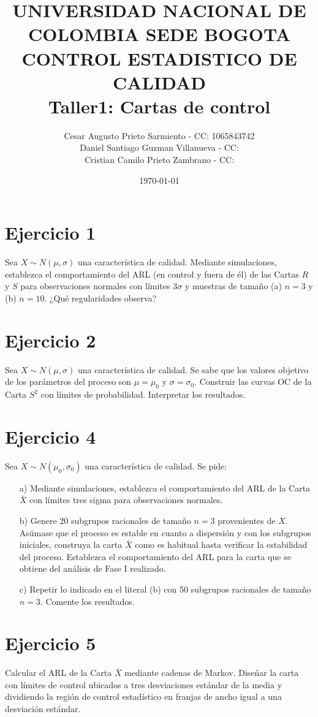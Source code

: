 \documentclass[11pt]{article}\usepackage[]{graphicx}\usepackage[table]{xcolor}
\title{UNIVERSIDAD NACIONAL DE COLOMBIA SEDE BOGOTA\\ CONTROL ESTADISTICO DE CALIDAD\\Taller1: Cartas de control }
\author{Cesar Augusto Prieto Sarmiento - CC: 1065843742\\
        Daniel Santiago Guzman Villanueva - CC: \\
        Cristian Camilo Prieto Zambrano - CC: }
\date{\today}
\begin{document}
\maketitle

\section*{Ejercicio 1}
Sea $X \sim N(\mu, \sigma)$ una característica de calidad. Mediante simulaciones, establezca el comportamiento del ARL (en control y fuera de él) de las Cartas $R$ y $S$ para observaciones normales con límites $3 \sigma$ y muestras de tamaño (a) $n=3$ y (b) $n=10$. ¿Qué regularidades observa?

\section*{Ejercicio 2}
Sea $X \sim N(\mu, \sigma)$ una característica de calidad. Se sabe que los valores objetivo de los parámetros del proceso son $\mu=\mu_0$ y $\sigma=\sigma_0$. Construir las curvas OC de la Carta $S^2$ con límites de probabilidad. Interpretar los resultados.

\section*{Ejercicio 4}
Sea $X \sim N(\mu_0, \sigma_0)$ una característica de calidad. Se pide:
\begin{enumerate}
    \item[a)] Mediante simulaciones, establezca el comportamiento del ARL de la Carta $\bar{X}$ con límites tres sigma para observaciones normales.
    \item[b)] Genere 20 subgrupos racionales de tamaño $n=3$ provenientes de $X$. Asúmase que el proceso es estable en cuanto a dispersión y con los subgrupos iniciales, construya la carta $\bar{X}$ como es habitual hasta verificar la estabilidad del proceso. Establezca el comportamiento del ARL para la carta que se obtiene del análisis de Fase I realizado.
    \item[c)] Repetir lo indicado en el literal (b) con 50 subgrupos racionales de tamaño $n=3$. Comente los resultados.
\end{enumerate}

\section*{Ejercicio 5}
Calcular el ARL de la Carta $\bar{X}$ mediante cadenas de Markov. Diseñar la carta con límites de control ubicados a tres desviaciones estándar de la media y dividiendo la región de control estadístico en franjas de ancho igual a una desviación estándar.
\end{document}
